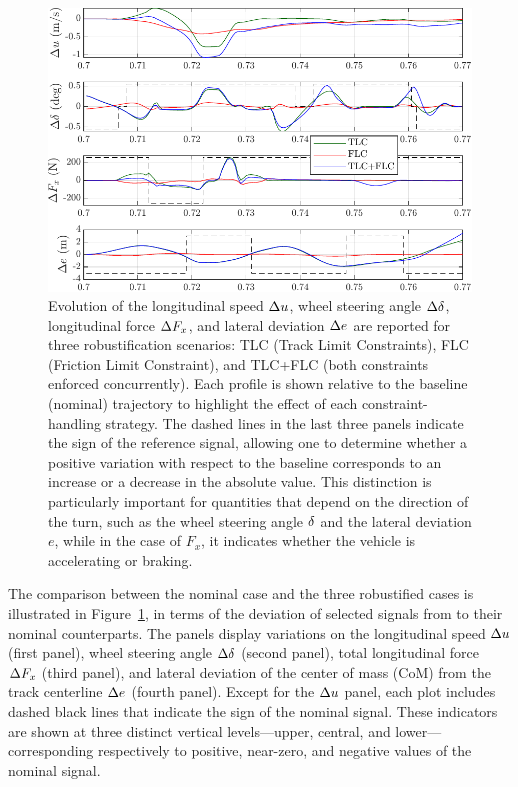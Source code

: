 \begin{figure}
	\centering
	\includegraphics{Fig/ol_telemetries.pdf}
	\caption{Evolution of the longitudinal speed $\Delta u$, wheel steering angle $\Delta \delta$, longitudinal force $\Delta F_x$, and lateral deviation $\Delta e$ are reported for three robustification scenarios: TLC (Track Limit Constraints), FLC (Friction Limit Constraint), and TLC+FLC (both constraints enforced concurrently). Each profile is shown relative to the baseline (nominal) trajectory to highlight the effect of each constraint-handling strategy. The dashed lines in the last three panels indicate the sign of the reference signal, allowing one to determine whether a positive variation with respect to the baseline corresponds to an increase or a decrease in the absolute value. This distinction is particularly important for quantities that depend on the direction of the turn, such as the wheel steering angle $\delta$ and the lateral deviation $e$, while in the case of $F_x$, it indicates whether the vehicle is accelerating or braking.}
	\label{fig:ol_telemetries}
\end{figure}


The comparison between the nominal case and the three robustified cases is illustrated in Figure~\ref{fig:ol_telemetries}, in terms of the deviation of selected signals from to their nominal counterparts.
The panels display variations on the longitudinal speed $\Delta u$ (first panel), wheel steering angle $\Delta \delta$ (second panel), total longitudinal force $\Delta F_x$ (third panel), and lateral deviation of the center of mass (CoM) from the track centerline $\Delta e$ (fourth panel).
Except for the $\Delta u$ panel, each plot includes dashed black lines that indicate the sign of the nominal signal.
These indicators are shown at three distinct vertical levels---upper, central, and lower---corresponding respectively to positive, near-zero, and negative values of the nominal signal.

